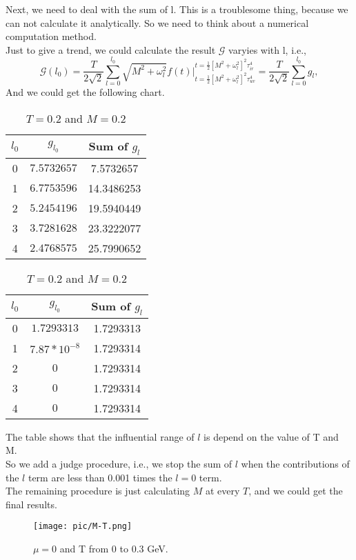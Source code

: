 \documentclass{article}
\begin{document}
Next, we need to deal with the sum of l. This is a troublesome thing, because we can not calculate it analytically. So we need to think about a numerical computation method.\\
Just to give a trend, we could calculate the result $\mathcal{G}$ varyies with l, i.e., 
\begin{equation}
    \mathcal{G}(l_0)=\frac{T}{2\sqrt{2}}\sum_{l=0}^{l_0}\sqrt{M^2+\omega_l^2}f(t)|_{t=\frac{1}{2}[M^2+\omega_l^2]^2\tau_{uv}^4}^{t=\frac{1}{2}[M^2+\omega_l^2]^2\tau_{ir}^4}= \frac{T}{2\sqrt{2}}\sum_{l=0}^{l_0}g_l,
\end{equation}
And we could get the following chart. 
\begin{table}[H]
\begin{minipage}{0.45\textwidth}
\begin{center}
    \begin{tabular}{|c|c|c|}
    \hline
    $l_0$ &$ g_{l_0} $& Sum of $g_l$\\
    \hline
    0 &$ 7.5732657 $ &7.5732657\\
    \hline
    1 &$  6.7753596 $ &14.3486253\\
    \hline
    2 &$  5.2454196 $ &19.5940449\\
    \hline
    3 &$   3.7281628 $ &23.3222077\\
    \hline
    4 &$   2.4768575 $ &25.7990652\\
    \hline
    \end{tabular}
    \caption{$T=0.02$ and $M=0.02$}
\end{center}
\end{minipage}
\begin{minipage}{0.45\textwidth}
    \begin{center}
        \begin{tabular}{|c|c|c|}
        \hline
        $l_0$ &$ g_{l_0} $& Sum of $g_l$\\
        \hline
        0 &$ 1.7293313 $ &1.7293313\\
        \hline
        1 &$  7.87*10^{-8} $ &1.7293314\\
        \hline
        2 &$  0 $ &1.7293314\\
        \hline
        3 &$   0 $ &1.7293314\\
        \hline
        4 &$   0 $ &1.7293314\\
        \hline
        \end{tabular}
        \caption{$T=0.2$ and $M=0.2$}
    \end{center}
    \end{minipage}
\end{table}
The table shows that the influential range of $l$ is depend on the value of T and M.\\
So we add a judge procedure, i.e., we stop the sum of $l$ when the contributions of the $l$ term are less than 0.001 times the $l=0$ term.\\
The remaining procedure is just calculating $M$ at every $T$, and we could get the final results.
    \begin{figure}[H]
    \centering
    \texttt{[image: pic/M-T.png]}
    \caption{$\mu=0$ and T from 0 to 0.3 GeV.}
    \end{figure}
\newpage
\end{document}

